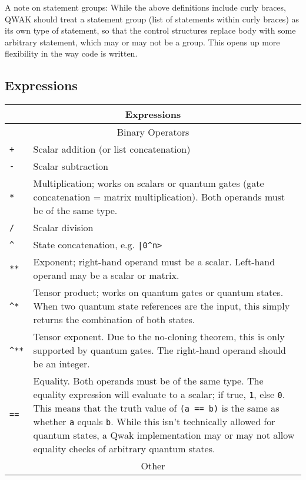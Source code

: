 \documentclass{article}
\begin{document}
A note on statement groups: While the above definitions include curly braces, QWAK should treat a statement group (list of statements within curly braces) as its own type of statement, so that the control structures replace {body} with some arbitrary statement, which may or may not be a group. This opens up more flexibility in the way code is written.

\subsection{Expressions}

\begin{center}
\begin{tabular}{| l | m{11cm} |}
\hline
\multicolumn{2}{|c|}{\textbf{Expressions}} \\ \hline
\multicolumn{2}{|c|}{Binary Operators} \\ \hline
\lstinline$+$ & Scalar addition (or list concatenation) \\ \hline
\lstinline$-$ & Scalar subtraction \\ \hline
\lstinline$*$ & Multiplication; works on scalars or quantum gates (gate concatenation = matrix multiplication). Both operands must be of the same type. \\ \hline
\lstinline$/$ & Scalar division \\ \hline
\lstinline$^$ & State concatenation, e.g. \lstinline$|0^n>$ \\ \hline
\lstinline$**$ & Exponent; right-hand operand must be a scalar. Left-hand operand may be a scalar or matrix. \\ \hline
\lstinline$^*$ & Tensor product; works on quantum gates or quantum states. When two quantum state references are the input, this simply returns the combination of both states. \\ \hline
\lstinline$^**$ & Tensor exponent. Due to the no-cloning theorem, this is only supported by quantum gates. The right-hand operand should be an integer. \\ \hline
\lstinline$==$ & Equality. Both operands must be of the same type. The equality expression will evaluate to a scalar; if true, \lstinline$1$, else \lstinline$0$. This means that the truth value of \lstinline$(a == b)$ is the same as whether \lstinline$a$ equals \lstinline$b$. While this isn’t technically allowed for quantum states, a Qwak implementation may or may not allow equality checks of arbitrary quantum states. \\ \hline
\multicolumn{2}{|c|}{Other} \\ \hline

\end{tabular}
\end{center}
\end{document}
